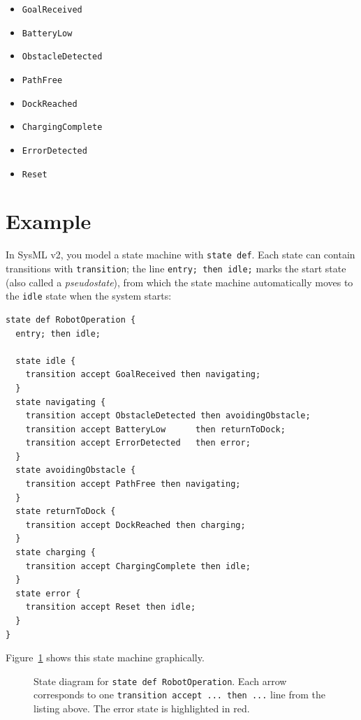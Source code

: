 \begin{itemize}
    \item \texttt{GoalReceived}
    \item \texttt{BatteryLow}
    \item \texttt{ObstacleDetected}
    \item \texttt{PathFree}
    \item \texttt{DockReached}
    \item \texttt{ChargingComplete}
    \item \texttt{ErrorDetected}
    \item \texttt{Reset}
\end{itemize}

\section{Example}
In SysML v2, you model a state machine with \texttt{state def}. Each state
can contain transitions with \texttt{transition}; the line \texttt{entry; then idle;} marks the start state (also called a \emph{pseudostate}), from which the state machine automatically moves to the \texttt{idle} state when the system starts:

\begin{lstlisting}
state def RobotOperation {
  entry; then idle;

  state idle {
    transition accept GoalReceived then navigating;
  }
  state navigating {
    transition accept ObstacleDetected then avoidingObstacle;
    transition accept BatteryLow      then returnToDock;
    transition accept ErrorDetected   then error;
  }
  state avoidingObstacle {
    transition accept PathFree then navigating;
  }
  state returnToDock {
    transition accept DockReached then charging;
  }
  state charging {
    transition accept ChargingComplete then idle;
  }
  state error {
    transition accept Reset then idle;
  }
}
\end{lstlisting}

Figure~\ref{fig:state-machine} shows this state machine graphically.

\begin{figure}[H]
  \centering
  \caption{State diagram for \texttt{state def RobotOperation}. Each
    arrow corresponds to one \texttt{transition accept ... then ...} line
    from the listing above. The error state is highlighted in red.}
  \label{fig:state-machine}
\end{figure}

